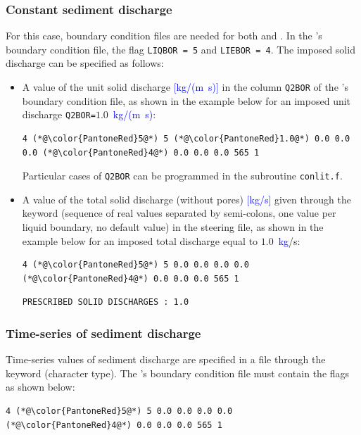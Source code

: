 \subsubsection{Constant sediment discharge}
For this case, boundary condition files are needed for both  and \gaia{}. In the \gaia{}'s boundary condition file, the flag \texttt{LIQBOR = 5} and \texttt{LIEBOR = 4}. The imposed solid discharge can be specified as follows:
\begin{itemize}
\item A value of the unit solid discharge \textcolor{blue}{[kg/(m~s)]} in the column \texttt{Q2BOR} of the \gaia{}'s boundary condition file, as shown in the example below for an imposed unit discharge \texttt{Q2BOR=}$1.0$~\textcolor{blue}{kg/(m~s)}:
\begin{lstlisting}[frame=trBL]
4 (*@\color{PantoneRed}5@*) 5 (*@\color{PantoneRed}1.0@*) 0.0 0.0 0.0 (*@\color{PantoneRed}4@*) 0.0 0.0 0.0 565 1
\end{lstlisting}

Particular cases of \texttt{Q2BOR} can be programmed in the subroutine \texttt{conlit.f}.

\item A value of the total solid discharge (without pores) \textcolor{blue}{[kg/s]} given through the keyword  (sequence of real values separated by semi-colons, one value per liquid boundary, no default value) in the steering file, as shown in the example below for an imposed total discharge equal to $1.0$~\textcolor{blue}{kg}/s:
\begin{lstlisting}[frame=trBL]
4 (*@\color{PantoneRed}5@*) 5 0.0 0.0 0.0 0.0 (*@\color{PantoneRed}4@*) 0.0 0.0 0.0 565 1
\end{lstlisting}

\begin{lstlisting}[frame=trBL]
PRESCRIBED SOLID DISCHARGES : 1.0
\end{lstlisting}

\end{itemize}

\subsubsection{Time-series of sediment discharge}
Time-series values of sediment discharge are specified in a file through the keyword  (character type). The \gaia{}'s boundary condition file must contain the flags as shown below:
\begin{lstlisting}[frame=trBL]
4 (*@\color{PantoneRed}5@*) 5 0.0 0.0 0.0 0.0 (*@\color{PantoneRed}4@*) 0.0 0.0 0.0 565 1
\end{lstlisting}

